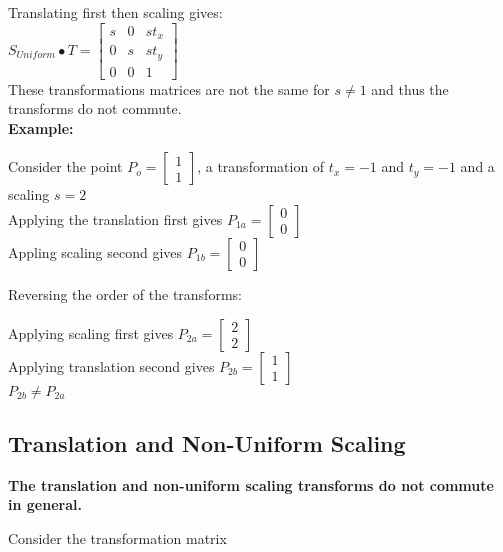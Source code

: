 \documentclass[a4paper,10pt]{scrartcl}
\begin{document}
Translating first then scaling gives: \\

$S_{Uniform} \bullet T = \begin{bmatrix}
		  s & 0 & st_x \\
		  0 & s & st_y \\
		  0 & 0 & 1
               \end{bmatrix}
$ \\ 

These transformations matrices are not the same for $s \neq 1$ and thus the transforms do not commute. \\ 

{\bfseries{Example:}}

Consider the point $P_o = \begin{bmatrix} 1 \\ 1 \end{bmatrix}$, a transformation of $t_x = -1$ and $t_y = -1$ and a scaling $s = 2$\\
Applying the translation first gives $P_{1a} = \begin{bmatrix} 0 \\ 0 \end{bmatrix}$ \\ 
Appling scaling second gives $P_{1b} = \begin{bmatrix} 0 \\ 0 \end{bmatrix}$

Reversing the order of the transforms:

Applying scaling first gives $P_{2a} = \begin{bmatrix} 2 \\ 2 \end{bmatrix}$ \\
Applying translation second gives  $P_{2b} = \begin{bmatrix} 1 \\ 1 \end{bmatrix}$ \\

$P_{2b} \neq P_{2a}$

\subsection{Translation and Non-Uniform Scaling}


{\bfseries The translation and non-uniform scaling transforms do not commute in general.}

Consider the transformation matrix \\
\end{document}
